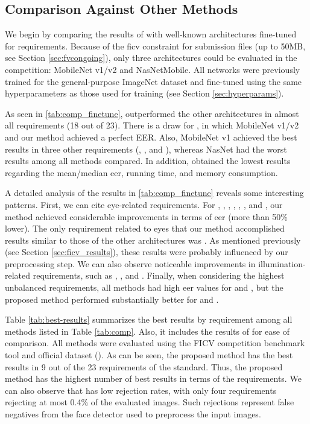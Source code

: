 \subsection{Comparison Against Other Methods}
 
We begin by comparing the results of \methodname with well-known architectures fine-tuned for \icao requirements. Because of the \acs{ficv} constraint for submission files (up to 50MB, see Section \ref{sec:fvcongoing}), only three architectures could be evaluated in the competition: MobileNet v1/v2 and NasNetMobile. All networks were previously trained for the general-purpose ImageNet dataset \citep{imagenetdataset} and fine-tuned using the same hyperparameters as those used for \methodname training (see Section \ref{sec:hyperparams}).
 
As seen in \autoref{tab:comp_finetune}, \methodname outperformed the other architectures in almost all requirements (18 out of 23). There is a draw for \veiloverface, in which MobileNet v1/v2 and our method achieved a perfect EER. Also, MobileNet v1 achieved the best results in three other requirements (\pixelation, \hatcap, and \otherfacesortoys), whereas NasNet had the worst results among all methods compared. In addition, \methodname obtained the lowest results regarding the mean/median \acs{eer}, running time, and memory consumption.
 
A detailed analysis of the results in \autoref{tab:comp_finetune} reveals some interesting patterns. First, we can cite eye-related requirements. For \lookingaway, \eyesclosed, \redeyes, \darktintedlenses, \flashlenses, \framestooheavy, and \framecoveringeyes, our method achieved considerable improvements in terms of \acs{eer} (more than 50\% lower). The only requirement related to eyes that our method accomplished results similar to those of the other architectures was \hairacrosseyes. As mentioned previously (see Section \ref{sec:ficv_results}), these results were probably influenced by our preprocessing step. We can also observe noticeable improvements in illumination-related requirements, such as \toodarklight, \shadowsbehindhead, and \shadowsacrossface. Finally, when considering the highest unbalanced requirements, all methods had high \acs{eer} values for \inkmarked and \otherfacesortoys, but the proposed method performed substantially better for \washedout and \framestooheavy.
 

 
Table \ref{tab:best-results} summarizes the best results by requirement among all methods listed in Table \ref{tab:comp}. Also, it includes the results of \methodname for ease of comparison. All methods were evaluated using the FICV competition benchmark tool and official dataset (\ficvofficial). As can be seen, the proposed method has the best results in 9 out of the 23 requirements of the \icao standard. Thus, the proposed method has the highest number of best results in terms of the requirements. We can also observe that \methodname has low rejection rates, with only four requirements rejecting at most 0.4\% of the evaluated images. Such rejections represent false negatives from the face detector used to preprocess the input images.
 

